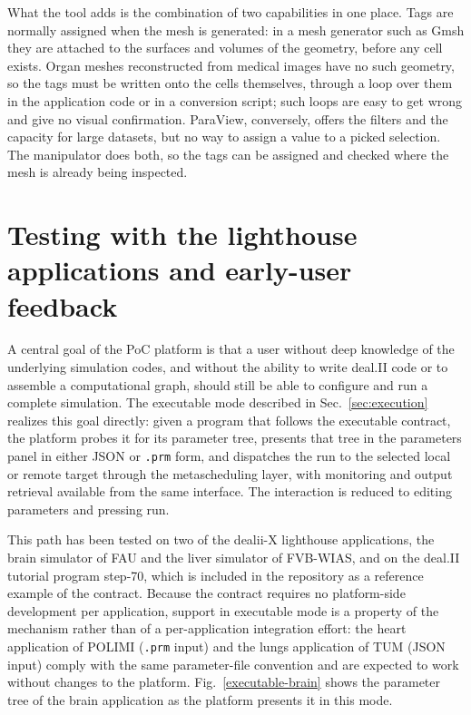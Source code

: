 \documentclass[a4paper,12pt]{article}
\begin{document}
What the tool adds is the combination of two capabilities in one place. Tags
are normally assigned when the mesh is generated: in a mesh generator such as
Gmsh they are attached to the surfaces and volumes of the geometry, before any
cell exists. Organ meshes reconstructed from medical images have no such
geometry, so the tags must be written onto the cells themselves, through a
loop over them in the application code or in a conversion script; such loops
are easy to get wrong and give no visual confirmation. ParaView, conversely,
offers the filters and the capacity for large datasets, but no way to assign a
value to a picked selection. The manipulator does both, so the tags can be
assigned and checked where the mesh is already being inspected.

\section{\textcolor{EUblue}{Testing with the lighthouse applications and
early-user feedback}}
\label{sec:validation}

A central goal of the PoC platform is that a user without deep knowledge of
the underlying simulation codes, and without the ability to write deal.II
code or to assemble a computational graph, should still be able to
configure and run a complete simulation. The executable mode described in
Sec.~\ref{sec:execution} realizes this goal directly: given a program that
follows the executable contract, the platform probes it for its parameter
tree, presents that tree in the parameters panel in either JSON or
\texttt{.prm} form, and dispatches the run to the selected local or remote
target through the metascheduling layer, with monitoring and output
retrieval available from the same interface. The interaction is reduced to
editing parameters and pressing run.

This path has been tested on two of the dealii-X lighthouse applications, the
brain simulator of FAU and the liver simulator of FVB-WIAS, and on the deal.II
tutorial program step-70, which is included in the repository as a reference
example of the contract. Because the contract requires no platform-side
development per application, support in executable mode is a property of the
mechanism rather than of a per-application integration effort: the heart
application of POLIMI (\texttt{.prm} input) and the lungs application of TUM
(JSON input) comply with the same parameter-file convention and are expected
to work without changes to the platform. Fig.~\ref{executable-brain} shows the
parameter tree of the brain application as the platform presents it in this
mode.
\end{document}
